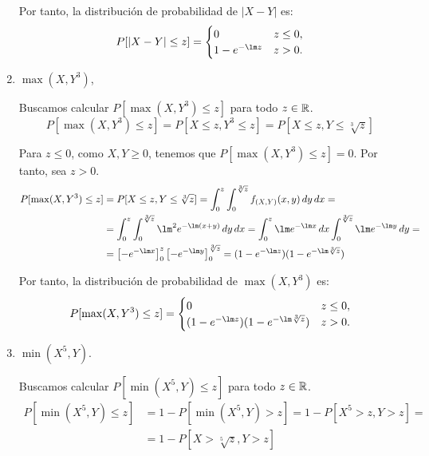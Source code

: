 \begin{ejercicio}
\begin{enumerate}
        Por tanto, la distribución de probabilidad de $|X-Y|$ es:
        \begin{equation*}
            P[|X-Y|\leq z] = \begin{cases}
                0 & z\leq 0, \\
                1-e^{-\lm z} & z>0.
            \end{cases}
        \end{equation*}

        \item $\max(X,Y^3)$,
        
        Buscamos calcular $P[\max(X,Y^3)\leq z]$ para todo $z\in\mathbb{R}$.
        \begin{equation*}
            P[\max(X,Y^3)\leq z]=P[X\leq z,Y^3\leq z]
            = P[X\leq z,Y\leq \sqrt[3]{z}]
        \end{equation*}

        Para $z\leq 0$, como $X,Y\geq 0$, tenemos que $P[\max(X,Y^3)\leq z]=0$. Por tanto, sea $z>0$.
        \begin{align*}
            P[\max(X,Y^3)\leq z]&=P[X\leq z,Y\leq \sqrt[3]{z}]
            = \int_{0}^{z}\int_{0}^{\sqrt[3]{z}} f_{(X,Y)}(x,y) \, dy \, dx
            =\\&= \int_{0}^{z}\int_{0}^{\sqrt[3]{z}} \lm^2 e^{-\lm(x+y)} \, dy \, dx
            = \int_{0}^{z}\lm e^{-\lm x} \, dx\int_{0}^{\sqrt[3]{z}} \lm e^{-\lm y} \, dy
            =\\&= \left[-e^{-\lm x}\right]_{0}^{z}\left[-e^{-\lm y}\right]_{0}^{\sqrt[3]{z}}
            = (1-e^{-\lm z})(1-e^{-\lm \sqrt[3]{z}})
        \end{align*}

        Por tanto, la distribución de probabilidad de $\max(X,Y^3)$ es:
        \begin{equation*}
            P[\max(X,Y^3)\leq z] = \begin{cases}
                0 & z\leq 0, \\
                (1-e^{-\lm z})(1-e^{-\lm \sqrt[3]{z}}) & z>0.
            \end{cases}
        \end{equation*}
        \item $\min(X^5,Y)$.
        
        Buscamos calcular $P[\min(X^5,Y)\leq z]$ para todo $z\in\mathbb{R}$.
        \begin{align*}
            P[\min(X^5,Y)\leq z]&=1-P[\min(X^5,Y)>z]=1-P[X^5>z,Y>z]
            =\\&= 1-P[X>\sqrt[5]{z},Y>z]
        \end{align*}


\end{enumerate}
\end{ejercicio}
